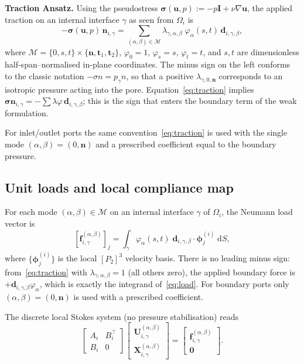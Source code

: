 \documentclass[11pt,a4paper]{article}
\newcommand{\pore}[1]{\Omega_{#1}}
\newcommand{\vel}{\bm{u}}
\newcommand{\pres}{p}
\newcommand{\stress}{\bm{\sigma}}
\newcommand{\normal}{\bm{n}}
\newcommand{\modeset}{\mathcal{M}}
\newcommand{\loadvec}{\bm{f}}
\newcommand{\respvel}{\mathbf{U}}
\begin{document}
\medskip\noindent
\textbf{Traction Ansatz.}
Using the pseudostress $\stress(\vel,\pres) := -\pres\mathbf{I} + \nu\nabla\vel$,
the applied traction on an internal interface $\gamma$ as seen from $\pore{i}$ is
\begin{equation}\label{eq:traction}
  -\stress(\vel,\pres)\,\normal_{i,\gamma}
  = \sum_{(\alpha,\beta)\in\modeset}
    \lambda_{\gamma,\alpha,\beta}\;
    \varphi_\alpha(s,t)\,\bm{d}_{i,\gamma,\beta},
\end{equation}
where $\modeset = \{0,s,t\}\times\{\normal,\bm{t}_1,\bm{t}_2\}$,
$\varphi_0=1$, $\varphi_s=s$, $\varphi_t=t$, and $s,t$ are dimensionless
half-span--normalised in-plane coordinates.
The minus sign on the left conforms to the classic notation
$-\sigma n = p_\gamma n$, so that a positive $\lambda_{\gamma,0,\normal}$
corresponds to an isotropic pressure acting into the pore.
Equation~\eqref{eq:traction} implies
$\stress\normal_{i,\gamma} = -\sum \lambda \varphi\,\bm{d}_{i,\gamma,\beta}$;
this is the sign that enters the boundary term of the weak formulation.

For inlet/outlet ports the same convention~\eqref{eq:traction} is used with
the single mode $(\alpha,\beta)=(0,\normal)$ and a prescribed coefficient
equal to the boundary pressure.

\subsection{Unit loads and local compliance map}

For each mode $(\alpha,\beta) \in \modeset$ on an internal interface
$\gamma$ of $\pore{i}$, the Neumann load vector is
\begin{equation}\label{eq:load}
  [\loadvec_{i,\gamma}^{(\alpha,\beta)}]_j
  = \int_{\gamma} \varphi_\alpha(s,t)\;
    \bm{d}_{i,\gamma,\beta} \cdot \bm{\phi}_j^{(i)} \;\mathrm{d}S,
\end{equation}
where $\{\bm{\phi}_j^{(i)}\}$ is the local $[P_2]^3$ velocity basis.
There is no leading minus sign: from~\eqref{eq:traction} with
$\lambda_{\gamma,\alpha,\beta}=1$ (all others zero), the applied boundary
force is $+\bm{d}_{i,\gamma,\beta}\varphi_\alpha$, which is exactly the
integrand of~\eqref{eq:load}.  For boundary ports only
$(\alpha,\beta)=(0,\normal)$ is used with a prescribed coefficient.

The discrete local Stokes system (no pressure stabilisation) reads
\begin{equation}\label{eq:local-sys}
  \begin{bmatrix} A_i & B_i^\top \\ B_i & 0 \end{bmatrix}
  \begin{bmatrix} \respvel_{i,\gamma}^{(\alpha,\beta)} \\
                   \mathbf{X}_{i,\gamma}^{(\alpha,\beta)} \end{bmatrix}
  = \begin{bmatrix} \loadvec_{i,\gamma}^{(\alpha,\beta)} \\ \bm{0} \end{bmatrix}.
\end{equation}
\end{document}
